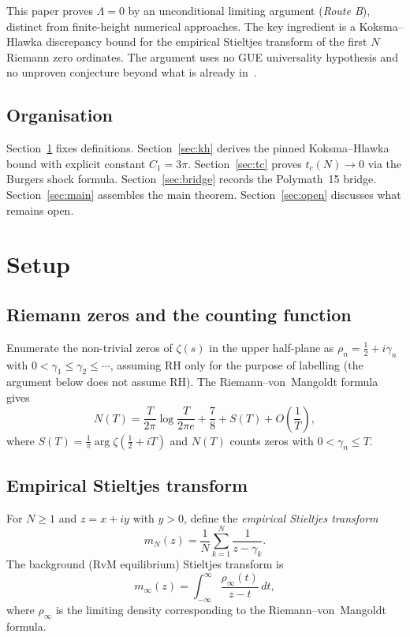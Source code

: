 \documentclass[11pt,reqno]{amsart}
\newcommand{\Lam}{\Lambda}
\newcommand{\tc}{t_c}
\newcommand{\mN}{m_N}
\newcommand{\minf}{m_\infty}
\begin{document}
This paper proves $\Lam = 0$ by an unconditional limiting argument (\emph{Route B}),
distinct from finite-height numerical approaches.
The key ingredient is a Koksma--Hlawka discrepancy bound for the empirical
Stieltjes transform of the first $N$ Riemann zero ordinates.
The argument uses no GUE universality hypothesis and no unproven conjecture
beyond what is already in~\cite{polymath15}.

\subsection*{Organisation}
Section~\ref{sec:setup} fixes definitions.
Section~\ref{sec:kh} derives the pinned Koksma--Hlawka bound with
explicit constant $C_1 = 3\pi$.
Section~\ref{sec:tc} proves $\tc(N)\to 0$ via the Burgers shock formula.
Section~\ref{sec:bridge} records the Polymath~15 bridge.
Section~\ref{sec:main} assembles the main theorem.
Section~\ref{sec:open} discusses what remains open.

\section{Setup}\label{sec:setup}

\subsection{Riemann zeros and the counting function}

Enumerate the non-trivial zeros of $\zeta(s)$ in the upper half-plane as
$\rho_n = \tfrac12 + i\gamma_n$ with $0 < \gamma_1 \leq \gamma_2 \leq \cdots$,
assuming RH only for the purpose of labelling (the argument below does not
assume RH).  The Riemann--von~Mangoldt formula gives
\begin{equation}
  N(T) = \frac{T}{2\pi}\log\frac{T}{2\pi e} + \frac78 + S(T) + O\!\left(\frac{1}{T}\right),
\end{equation}
where $S(T) = \tfrac1\pi \arg \zeta(\tfrac12 + iT)$ and $N(T)$ counts zeros
with $0 < \gamma_n \leq T$.

\subsection{Empirical Stieltjes transform}

For $N \geq 1$ and $z = x + iy$ with $y > 0$, define the \emph{empirical
Stieltjes transform}
\begin{equation}
  \mN(z) = \frac1N \sum_{k=1}^N \frac{1}{z - \gamma_k}.
\end{equation}
The background (RvM equilibrium) Stieltjes transform is
\begin{equation}
  \minf(z) = \int_{-\infty}^{\infty} \frac{\rho_\infty(t)}{z - t}\,dt,
\end{equation}
where $\rho_\infty$ is the limiting density corresponding to the
Riemann--von~Mangoldt formula.
\end{document}
